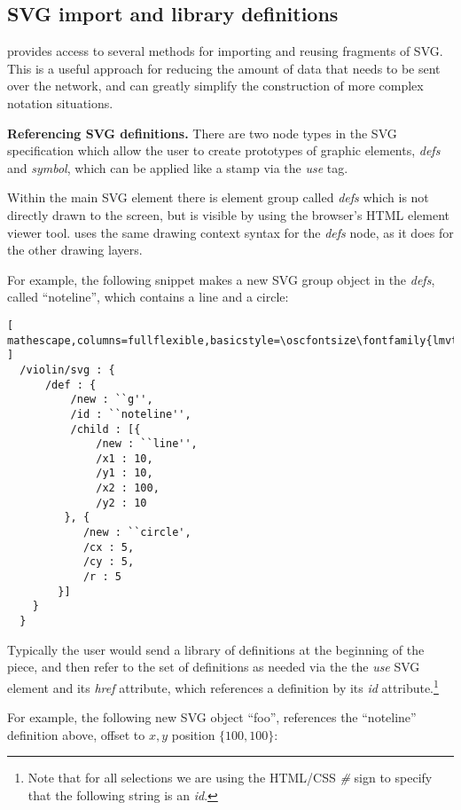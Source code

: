 \subsection{SVG import and library definitions}\label{sec:defs}
\drawsocket provides access to several methods for importing and reusing fragments of SVG.
This is a useful approach for reducing the amount of data that needs to be sent over the network, and can greatly simplify the construction of more complex notation situations.

\medskip
\noindent
\textbf{Referencing SVG definitions.} 
There are two node types in the SVG specification which allow the user to create prototypes of graphic elements, \textit{defs} and \textit{symbol}, which can be applied like a stamp via the \textit{use} tag. 

Within the \drawsocket main SVG element there is element group called \textit{defs} which is not directly drawn to the screen, but is visible by using the browser's HTML element viewer tool.
\drawsocket uses the same drawing context syntax for the \textit{defs} node, as it does for the other drawing layers.

For example, the following snippet makes a new SVG group object in the \textit{defs}, called ``noteline'', which contains a line and a circle:

\begin{lstlisting}[ mathescape,columns=fullflexible,basicstyle=\oscfontsize\fontfamily{lmvtt}\selectfont ]
  /violin/svg : {
      /def : {
          /new : ``g'',
          /id : ``noteline'',
          /child : [{
              /new : ``line'',
              /x1 : 10,
              /y1 : 10,
              /x2 : 100,
              /y2 : 10
         }, {
            /new : ``circle',
            /cx : 5,
            /cy : 5,
            /r : 5
        }]
    } 
  }
 \end{lstlisting}

Typically the user would send a library of definitions at the beginning of the piece, and then refer to the set of definitions as needed via the the \textit{use} SVG element and its \textit{href} attribute, which references a definition by its \textit{id} attribute.\footnote{Note that for all selections we are using the HTML/CSS \textit{\#} sign to specify that the following string is an \textit{id}.}

For example, the following new SVG object ``foo'', references the ``noteline'' definition above, offset to ${x,y}$ position $\{100,100\}$:


